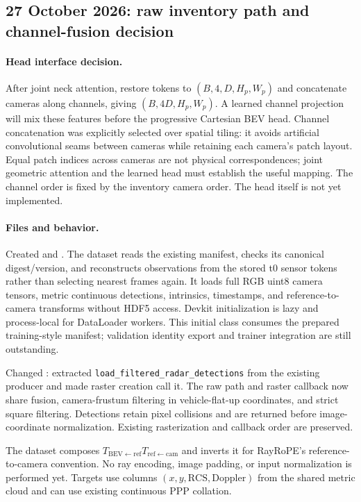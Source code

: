 \documentclass[11pt,a4paper]{article}
\begin{document}
\subsection{27 October 2026: raw inventory path and channel-fusion decision}
\paragraph{Head interface decision.}
After joint neck attention, restore tokens to $(B,4,D,H_p,W_p)$ and concatenate cameras along channels, giving $(B,4D,H_p,W_p)$. A learned channel projection will mix these features before the progressive Cartesian BEV head. Channel concatenation was explicitly selected over spatial tiling: it avoids artificial convolutional seams between cameras while retaining each camera's patch layout. Equal patch indices across cameras are not physical correspondences; joint geometric attention and the learned head must establish the useful mapping. The channel order is fixed by the inventory camera order. The head itself is not yet implemented.

\paragraph{Files and behavior.}
Created  and . The dataset reads the existing manifest, checks its canonical digest/version, and reconstructs observations from the stored t0 sensor tokens rather than selecting nearest frames again. It loads full RGB uint8 camera tensors, metric continuous detections, intrinsics, timestamps, and reference-to-camera transforms without HDF5 access. Devkit initialization is lazy and process-local for DataLoader workers. This initial class consumes the prepared training-style manifest; validation identity export and trainer integration are still outstanding.

Changed : extracted \texttt{load\_filtered\_radar\_detections} from the existing producer and made raster creation call it. The raw path and raster callback now share fusion, camera-frustum filtering in vehicle-flat-up coordinates, and strict square filtering. Detections retain pixel collisions and are returned before image-coordinate normalization. Existing rasterization and callback order are preserved.

The dataset composes $T_{\mathrm{BEV}\leftarrow\mathrm{ref}}T_{\mathrm{ref}\leftarrow\mathrm{cam}}$ and inverts it for RayRoPE's reference-to-camera convention. No ray encoding, image padding, or input normalization is performed yet. Targets use columns $(x,y,\mathrm{RCS},\mathrm{Doppler})$ from the shared metric cloud and can use existing continuous PPP collation.
\end{document}
